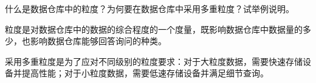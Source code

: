 \begin{problem}
什么是数据仓库中的粒度？为何要在数据仓库中采用多重粒度？试举例说明。
\end{problem}

\begin{solution}
粒度是对数据仓库中的数据的综合程度的一个度量，既影响数据仓库中数据量的多少，也影响数据仓库能够回答询问的种类。

采用多重粒度是为了应对不同级别的粒度要求：对于大粒度数据，需要快速存储设备并提高性能；对于小粒度数据，需要低速存储设备并满足细节查询。

\begin{figure}[H]
	\setcounter{subfigure}{0}
	\centering
	\vspace{-1em}	
	\centering
	\vspace{-1.5em}
\end{figure}

\end{solution}


